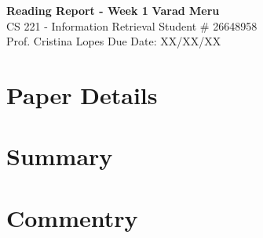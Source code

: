 \documentclass[a4paper, 11pt]{article}
\begin{document}
\noindent
\large\textbf{Reading Report - Week 1} \hfill \textbf{Varad Meru} \\
\normalsize CS 221 - Information Retrieval \hfill Student \# 26648958 \\
Prof. Cristina Lopes \hfill Due Date: XX/XX/XX

\section*{Paper Details}
\lipsum[1]

\section*{Summary}
\lipsum[2]

\section*{Commentry}
\lipsum[3]
\end{document}
